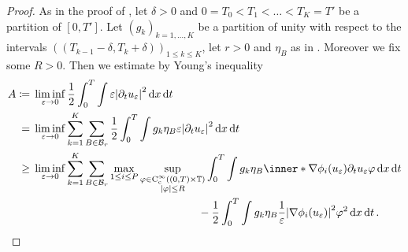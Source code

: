 \begin{proof}
	As in the proof of , let $ \delta > 0 $ 
	and $ 0 = T_{ 0 } < T_{ 1 } < \dotsc < T_{ K } = T' $ be a partition of $ [ 
	0 , T' ] $. Let $ ( g_{ k } )_{ k = 1 , \dotsc , K } $ be a partition of 
	unity with respect to the intervals $ \left( ( T_{ k - 1 } - \delta , T_{ k 
	} + \delta )\right)_{ 1 \leq k \leq K} $, let $ r > 0 $
	and $ \eta_{ B } $ as in 
	. Moreover we fix some $ R > 0 $. 
	Then we estimate by Young's inequality
	\begin{align*}
		 A \coloneqq{}& \liminf_{ \varepsilon \to 0 }
			\frac{ 1 }{ 2 }
			\int_{ 0 }^{ T }
				\int
					\varepsilon
					\abs{ \partial_{ t } u_{ \varepsilon } }^{ 2 }
				\dd{ x }
			\dd{ t }
		\\
		={} &
		\liminf_{ \varepsilon \to 0 }
			\sum_{ k = 1 }^{ K }
				\sum_{ B \in \mathcal{ B }_{ r } } 
					\frac{ 1 }{ 2 }
					\int_{ 0 }^{ T }
						\int
							g_{ k } \eta_{ B }
							\varepsilon
							\abs{ \partial_{ t } u_{ \varepsilon } }^{ 2 }
						\dd{ x }
					\dd{ t }
		\\
		\geq{} &
		\liminf_{ \varepsilon \to 0 }
			\sum_{ k = 1 }^{ K }
				\sum_{ B \in \mathcal{ B }_{ r } }
					\max_{ 1 \leq i \leq P }
						\sup_{ 
							\substack{ 
								\varphi \in \cont_{ \mathrm{c} }^{ \infty } 
								\left( ( 0 , T ) \times \flattorus \right)
								\\
								\abs{ \varphi } \leq R  
							}
						}
							\int_{ 0 }^{ T }
								\int
									g_{ k } \eta_{ B }
									\inner*{ \nabla \phi_{ i } ( u_{ 
									\varepsilon 
									} ) }{ \partial_{ t } u_{ \varepsilon } }
									\varphi
								\dd{ x }
							\dd{ t } 
		\\
							& \qquad \qquad \qquad \qquad \qquad \qquad \qquad 
							\quad 
							 -
							\frac{ 1 }{ 2 }
							\int_{ 0 }^{ T }
								\int
									g_{ k } \eta_{ B }
									\frac{ 1 }{ \varepsilon }
									\abs{ \nabla \phi_{ i } ( u_{ \varepsilon } 
									) }^{ 2 }
									\varphi^{ 2 }
								\dd{ x }
							\dd{ t }.
	\end{align*}
	\begin{comment}
	\geq{} &
	\liminf_{ \varepsilon \to 0 }
	\sum_{ k = 1 }^{ K }
	\sum_{ B \in \mathcal{ B }_{ r } }
	\max_{ 1 \leq i \leq P }
	\sup_{ 
		\substack{ 
			\varphi \in \cont_{ \mathrm{c} }^{ \infty } 
			\left( ( 0 , T ) \times \flattorus \right)
			\\
			\abs{ \varphi } \leq R  
		}
	}
	\int_{ 0 }^{ T }
	\int
	g_{ k } \eta_{ B }
	\partial_{ t } \psi_{ \varepsilon , i }

\end{comment}
\end{proof}
